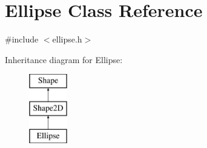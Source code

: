 \hypertarget{classEllipse}{\section{Ellipse Class Reference}
\label{classEllipse}
}


{\ttfamily \#include $<$ellipse.\-h$>$}

Inheritance diagram for Ellipse\-:\begin{figure}[H]
\begin{center}
\leavevmode
\includegraphics[height=3.000000cm]{classEllipse}
\end{center}
\end{figure}
